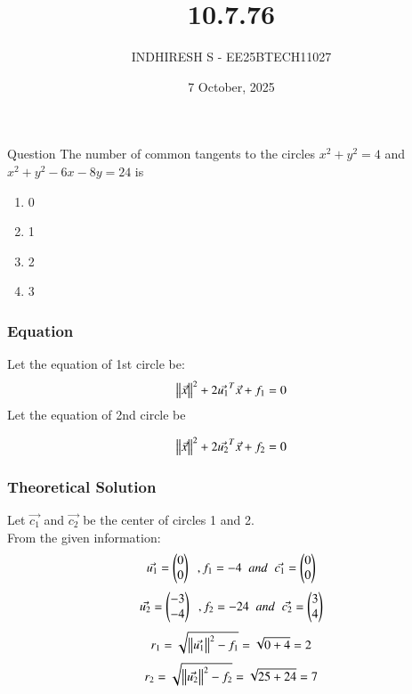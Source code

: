 \documentclass{beamer}
\title %
    {10.7.76}
\date{7 October, 2025}
\author %
    {INDHIRESH S - EE25BTECH11027}
\begin{document}
    
    \frame{\titlepage}
    
    \begin{frame}{Question}
   The number of common tangents to the circles $x^2 +y^2 = 4$ and $x^2 +y^2 -6x-8y = 24$ is
\begin{enumerate}
    \item 0
    \item 1
    \item 2
    \item 3
\end{enumerate}
    \end{frame}
    
    \begin{frame}[allowframebreaks] 
    \frametitle{Equation}
        \centering
        \label{tab:parameters}
  Let the equation of 1st circle be:
\begin{align}
 \left\lVert\Vec{x}\right\rVert^2+2\Vec{u_1}^T\Vec{x}+f_1=0
\end{align}
Let the equation of 2nd circle be 

\begin{align}
  \left\lVert\Vec{x}\right\rVert^2+2\Vec{u_2}^T\Vec{x}+f_2=0
\end{align}

    \end{frame}
    
    \begin{frame}
    \frametitle{Theoretical Solution}
    Let $\Vec{c_1}$ and $\Vec{c_2}$ be the center of circles 1 and 2.\\
From the given information:
\begin{align}
\Vec{u_1}=\begin{pmatrix}0\\0\end{pmatrix}\;\;,f_1=-4\;\;and\;\;\Vec{c_1}=\begin{pmatrix}0\\0\end{pmatrix}
\end{align}
\begin{align}
\Vec{u_2}=\begin{pmatrix}-3\\-4\end{pmatrix}\;\;,f_2=-24\;\;and\;\;\Vec{c_2}=\begin{pmatrix}3\\4\end{pmatrix}
\end{align}
    \begin{align}
 r_1=\sqrt{\left\lVert\Vec{u_1}\right\rVert^2-f_1}=\sqrt{0+4}=2
\end{align}
\begin{align}
    r_2=\sqrt{\left\lVert\Vec{u_2}\right\rVert^2-f_2}=\sqrt{25+24}=7
\end{align}


    \end{frame}
    
\end{document}
